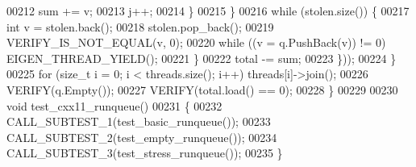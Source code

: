 \begin{DoxyCode}
00212           sum += v;
00213           j++;
00214         \}
00215       \}
00216       \textcolor{keywordflow}{while} (stolen.size()) \{
00217         \textcolor{keywordtype}{int} v = stolen.back();
00218         stolen.pop\_back();
00219         VERIFY\_IS\_NOT\_EQUAL(v, 0);
00220         \textcolor{keywordflow}{while} ((v = q.PushBack(v)) != 0) EIGEN\_THREAD\_YIELD();
00221       \}
00222       total -= sum;
00223     \}));
00224   \}
00225   \textcolor{keywordflow}{for} (\textcolor{keywordtype}{size\_t} i = 0; i < threads.size(); i++) threads[i]->join();
00226   VERIFY(q.Empty());
00227   VERIFY(total.load() == 0);
00228 \}
00229 
00230 \textcolor{keywordtype}{void} test\_cxx11\_runqueue()
00231 \{
00232   CALL\_SUBTEST\_1(test\_basic\_runqueue());
00233   CALL\_SUBTEST\_2(test\_empty\_runqueue());
00234   CALL\_SUBTEST\_3(test\_stress\_runqueue());
00235 \}
\end{DoxyCode}
